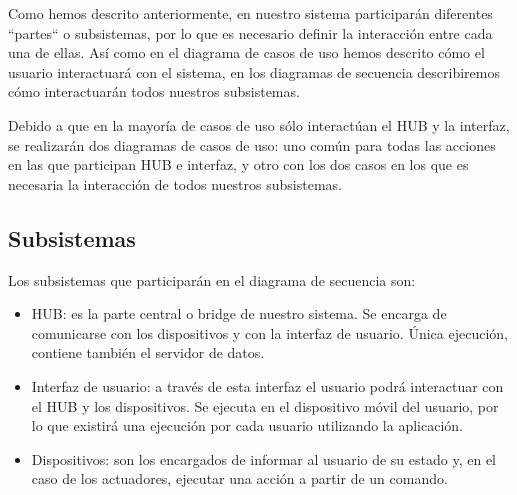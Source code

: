Como hemos descrito anteriormente, en nuestro sistema participarán diferentes ``partes`` o subsistemas, por lo que es necesario definir la interacción entre cada
una de ellas. Así como en el diagrama de casos de uso hemos descrito cómo el usuario interactuará con el sistema, en los diagramas de secuencia describiremos
cómo interactuarán todos nuestros subsistemas.
\par
Debido a que en la mayoría de casos de uso sólo interactúan el HUB y la interfaz, se realizarán dos diagramas de casos de uso: uno común para todas las acciones
en las que participan HUB e interfaz, y otro con los dos casos en los que es necesaria la interacción de todos nuestros subsistemas.
\subsection{Subsistemas}
Los subsistemas que participarán en el diagrama de secuencia son:
\begin{itemize}
\item{HUB}: es la parte central o bridge de nuestro sistema. Se encarga de comunicarse con los dispositivos y con la interfaz de usuario. Única ejecución, contiene también
el servidor de datos.
\item{Interfaz de usuario:} a través de esta interfaz el usuario podrá interactuar con el HUB y los dispositivos. Se ejecuta en el dispositivo móvil del usuario, por lo 
que existirá una ejecución por cada usuario utilizando la aplicación.
\item{Dispositivos:} son los encargados de informar al usuario de su estado y, en el caso de los actuadores, ejecutar una acción a partir de un comando.
\end{itemize}
